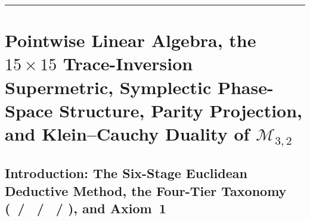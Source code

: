 \documentclass[11pt,a4paper]{article}
\newcommand{\catA}{\text{\textbf{\textcolor{purple!80!black}{[A]}}}}
\newcommand{\catD}{\text{\textbf{\textcolor{blue!75!black}{[D]}}}}
\newcommand{\catH}{\text{\textbf{\textcolor{orange!80!black}{[H]}}}}
\newcommand{\catN}{\text{\textbf{\textcolor{teal!75!black}{[N]}}}}
\theoremstyle{definition}
\theoremstyle{plain}
\theoremstyle{remark}
\begin{document}
\begin{abstract}
prove that under Axioms~\ref{ax:axiom_two} and~\ref{ax:axiom_three}, $\widehat{\mathcal{K}}_{\mathrm{JV}}(s) = \exp(-s\widehat{\mathcal{D}}_{\mathrm{JV}}^2)$ generates $\mathcal{I}_{3,2}$ \catD\ / \catH. Finally, \textbf{Section~7} codifies the complete four-tier epistemological architecture (\catA\ / \catD\ / \catH\ / \catN) separating the pure deductive theorems of this foundational monograph from physical bridge hypotheses and numerical evaluations.

\vspace{0.20cm}
\noindent\textbf{PACS / PhySH:} 02.40.Ky, 04.20.Cv, 04.50.-h, 02.30.Jr, 02.30.Tb, 11.10.Kk, 02.40.Gh \\
\textbf{Keywords:} \emph{Principia Geometrica}, Covariant Bitemporal Geometrodynamics (CBG), $S^1/\mathbb{Z}_2$ Orbifold Bundle, Trace-Inversion Supermetric, Symplectic Phase Space, Real $\mathrm{Cl}(3,2)$ Spinors, Klein Pfaffian Quadric, Lichnerowicz--Weitzenb\"ock Identity, Spectral Action, Jacobi $\vartheta_3/\vartheta_4$ Modular Duality, Frobenius Horizon Regularity, Operator Pyramid.
\end{abstract}

\vspace{0.12cm}
\hrule
\vspace{0.26cm}

\section{\texorpdfstring{Pointwise Linear Algebra, the $15\times 15$ Trace-Inversion Supermetric, Symplectic Phase-Space Structure, Parity Projection, and Klein--Cauchy Duality of $\mathcal{M}_{3,2}$ \catD}{Pointwise Linear Algebra, the 15x15 Trace-Inversion Supermetric, Symplectic Phase-Space Structure, Parity Projection, and Klein-Cauchy Duality of M\_\{3,2\}}}
\label{sec:c1_linear_algebra}

\subsection{Introduction: The Six-Stage Euclidean Deductive Method, the Four-Tier Taxonomy (\catA\ / \catD\ / \catH\ / \catN), and Axiom~1}
\end{document}
